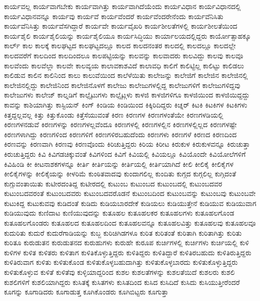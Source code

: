 {ಕಾರ್ಯವಲ್ಲ
ಕಾರ್ಯವಾಗಬೇಕು
ಕಾರ್ಯವಾಗಿತ್ತು
ಕಾರ್ಯವಾಗಿದೆಯೆಂದು
ಕಾರ್ಯವಿಧಾನ
ಕಾರ್ಯವಿಧಾನದಲ್ಲಿ
ಕಾರ್ಯವಿಧಾನವನ್ನೂ
ಕಾರ್ಯವು
ಕಾರ್ಯವೆ
ಕಾರ್ಯವೆಂದರೆ
ಕಾರ್ಯವೆಂದರೇನೆಂದು
ಕಾರ್ಯವೆನಿಸಿತು
ಕಾರ್ಯವೆನಿಸಿತ್ತು
ಕಾರ್ಯವೆಸಗಿದ್ದಾರೆ
ಕಾರ್ಯವೇ
ಕಾರ್ಯವೈಖರಿ
ಕಾರ್ಯಶೀಲತೆಗಳಲ್ಲಿ
ಕಾರ್ಯಶೀಲತೆಯಿಂದ
ಕಾರ್ಯಶೈಲಿ
ಕಾರ್ಯಶೈಲಿಯನ್ನು
ಕಾರ್ಯಶೈಲಿಯೂ
ಕಾರ್ಯಸಿದ್ಧಿಯು
ಕಾರ್ಯಾಲಯದಲ್ಲಿದ್ದರು
ಕಾರ್ಯೋತ್ಸಾಹಕ್ಕೂ
ಕಾರ್ಲ್
ಕಾಲ
ಕಾಲಕ್ಕೆ
ಕಾಲಘಟ್ಟದ
ಕಾಲಘಟ್ಟದಲ್ಲೂ
ಕಾಲದ
ಕಾಲದನಂತರ
ಕಾಲದಲ್ಲಿ
ಕಾಲದಲ್ಲೂ
ಕಾಲದಲ್ಲೇ
ಕಾಲದವರೆಗೆ
ಕಾಲದಿಂದ
ಕಾಲದಿಂದಲೂ
ಕಾಲಪಟ್ಟಿಯನ್ನು
ಕಾಲವನ್ನು
ಕಾಲವಾದರು
ಕಾಲವಿದ್ದು
ಕಾಲವು
ಕಾಲವೂ
ಕಾಲವೆಂದು
ಕಾಲವೆಲ್ಲಾ
ಕಾಲವೇ
ಕಾಲವ್ಯಯ
ಕಾಲಾವಕಾಶವಿದೆ
ಕಾಲಾವಧಿ
ಕಾಲಿಗೆ
ಕಾಲಿಟ್ಟಿಲ್ಲ
ಕಾಲಿಟ್ಟು
ಕಾಲಿಡಲು
ಕಾಲಿಡುವ
ಕಾಲಿನ
ಕಾಲಿನಿಂದ
ಕಾಲು
ಕಾಲುವೆಯಿಂದ
ಕಾಲೆಳೆಯಿತು
ಕಾಲೇಜನ್ನು
ಕಾಲೇಜಿಗೆ
ಕಾಲೇಜಿನ
ಕಾಲೇಜಿನಲ್ಲಿ
ಕಾಲೇಜಿನಲ್ಲಿದ್ದು
ಕಾಲೇಜಿನಿಂದ
ಕಾಲೇಜಿನೊಳಗೆ
ಕಾಲೇಜು
ಕಾಲೇಜುಗಳಲ್ಲಿದ್ದ
ಕಾಲೇಜುಗಳಿಗೆ
ಕಾಲೇಜುಗಳಿದ್ದವು
ಕಾಲೇಜುಗಳು
ಕಾಲೇಜ್
ಕಾಲ್ನಡಿಗೆ
ಕಾಲ್ಸೈಟುಗಳು
ಕಾಲ್ಸೈಟ್ಗಳು
ಕಾಳಜಿ
ಕಾಳಜಿಗಳಿಗೂ
ಕಾಳಜಿಯಿಂದ
ಕಾಳಜಿಯಿದ್ದದ್ದು
ಕಾವನ್ನು
ಕಾಶಿಯಾಗಿತ್ತು
ಕಾಸ್ಟಿಯನ್
ಕಿಂಗ್
ಕಿಂಡಿಯ
ಕಿಂಡಿಯಿಂದ
ಕಿಕ್ಕಿರಿದಿದ್ದರು
ಕಿಚ್ನರ್
ಕಿಟಕಿ
ಕಿಟಕಿಗಳ
ಕಿಟಕಿಗಳು
ಕಿತ್ತದ್ದಲ್ಲವಲ್ಲ
ಕಿತ್ತು
ಕಿತ್ತುಕೊಂಡು
ಕಿತ್ತೆಸೆಯುವಂತೆ
ಕಿರಣ
ಕಿರಣಗಳ
ಕಿರಣಗಳಂತೆಯೇ
ಕಿರಣಗಳಡಿಯಲ್ಲಿ
ಕಿರಣಗಳನಡುವೆ
ಕಿರಣಗಳನ್ನು
ಕಿರಣಗಳಲ್ಲವೆಂದೂ
ಕಿರಣಗಳಲ್ಲಿ
ಕಿರಣಗಳಲ್ಲಿನ
ಕಿರಣಗಳಲ್ಲಿಲ್ಲದ
ಕಿರಣಗಳಷ್ಟೇ
ಕಿರಣಗಳಾಗಿದ್ದು
ಕಿರಣಗಳಿಂದ
ಕಿರಣಗಳಿಗೆ
ಕಿರಣಗಳಿರಬಹುದೆಂದು
ಕಿರಣಗಳು
ಕಿರಣಗಳೆ
ಕಿರಣದ
ಕಿರಣದಿಂದ
ಕಿರಣವನ್ನು
ಕಿರಣವಾಗಿ
ಕಿರಣವು
ಕಿರಣವೊಂದು
ಕಿರಿಚುತ್ತಿದ್ದರು
ಕಿರಿಯ
ಕಿರೀಟ
ಕಿರುಕುಳ
ಕಿರುಕುಳವನ್ನೂ
ಕಿರುಚುತ್ತಾ
ಕಿರುಚುತ್ತಿದ್ದರು
ಕಿವಿ
ಕಿವಿಗಡಚಿಕ್ಕುವಂತೆ
ಕಿವಿಗಳಿಂದ
ಕಿವಿಗೆ
ಕಿವಿಯಲ್ಲಿ
ಕಿವಿಯಲ್ಲೂ
ಕಿವಿಯೊಂದೇ
ಕಿವಿಯೋಲೆಗಳಿಗೆ
ಕಿವಿಹಿಂಡಿ
ಕೀ
ಕೀಟನಾಶಕಗಳನ್ನೂ
ಕೀರ್ತಿ
ಕೀರ್ತಿಯನ್ನು
ಕೀರ್ತಿಯಲ್ಲಿ
ಕೀರ್ತಿಯಾಗಿದೆ
ಕೀಲಿ
ಕೀಲಿಕೈ
ಕೀಲಿಕೈಗಳ
ಕೀಲಿಕೈಗಳನ್ನು
ಕೀಲಿಕೈಯನ್ನು
ಕೀಳರಿಮೆ
ಕುಂಠಿತವಾದವು
ಕುಂದಾಗಲಿಲ್ಲ
ಕುಂದಿತು
ಕುಗ್ಗದ
ಕುಗ್ಗಲಿಲ್ಲ
ಕುಗ್ಗಿದಂತೆ
ಕುಗ್ಗುವಂತಾಯಿತು
ಕುಟೀರದಂತಿದ್ದ
ಕುಟೀರದಲ್ಲಿ
ಕುಟುಂಬ
ಕುಟುಂಬದ
ಕುಟುಂಬದಲ್ಲಿ
ಕುಟುಂಬದವರ
ಕುಟುಂಬದವರಂತೆ
ಕುಟುಂಬದವರು
ಕುಟುಂಬದವರೊಡನೆ
ಕುಟುಂಬದಿಂದ
ಕುಟುಂಬವನ್ನು
ಕುಟುಂಬವು
ಕುಟುಂಬವೇ
ಕುಟುಕಿದ್ದ
ಕುಟುಕುವವು
ಕುಡಿದಂತೆ
ಕುಡಿದು
ಕುಡಿಯಬಾರದೇಕೆ
ಕುಡಿಯಲು
ಕುಡಿಯುತ್ತೇನೆ
ಕುಡಿಯುವ
ಕುಡಿಯುವಾಗ
ಕುಡಿಯುವುದು
ಕುಣಿದಾಟ
ಕುಣಿಯುವುದನ್ನು
ಕುತೂಹಲ
ಕುತೂಹಲಕರ
ಕುತೂಹಲಗಳು
ಕುತೂಹಲಗೊಂಡ
ಕುತೂಹಲಗೊಂಡರು
ಕುತೂಹಲದ
ಕುತೂಹಲದಿಂದ
ಕುತೂಹಲವನ್ನೂ
ಕುತೂಹಲವಿತ್ತು
ಕುತೂಹಲವು
ಕುತೂಹಲವೂ
ಕುದುರಿತು
ಕುದುರೆ
ಕುದುರೆಗಾಡಿಯನ್ನು
ಕುಬ್ಜ
ಕುರಿಚಿಗಿಡಗಳೂ
ಕುರಿತ
ಕುರಿತಂತೆ
ಕುರಿತಾಗಿ
ಕುರಿತಾಗಿತ್ತು
ಕುರಿತು
ಕುರಿತೂ
ಕುರುಡುತನ
ಕುರುಡುತನದ
ಕುರುಹುಗಳು
ಕುರುಹೇ
ಕುರೂಪ
ಕುರ್ಚಿಗಳಲ್ಲಿ
ಕುರ್ಚಿಗಳು
ಕುರ್ಚಿಯಲ್ಲಿ
ಕುಳಿ
ಕುಳಿಗಳ
ಕುಳಿತ
ಕುಳಿತರು
ಕುಳಿತಾಗ
ಕುಳಿತಿಕೊಳ್ಳುತ್ತಿದ್ದರು
ಕುಳಿತಿದ್ದರು
ಕುಳಿತಿದ್ದಾರೆ
ಕುಳಿತಿರಬಹುದು
ಕುಳಿತಿರುತ್ತಿದ್ದರು
ಕುಳಿತಿರುವಾಗ
ಕುಳಿತು
ಕುಳಿತುಕೊಂಡ
ಕುಳಿತುಕೊಳ್ಳಬಹುದಾಗಿತ್ತು
ಕುಳಿತುಕೊಳ್ಳಬಾರದು
ಕುಳಿತುಕೊಳ್ಳುತ್ತಿದ್ದರು
ಕುಳಿತುಕೊಳ್ಳುವ
ಕುಳಿತೆ
ಕುಳಿತೆವು
ಕುಳ್ಳಿಯಾದ್ದರಿಂದ
ಕುಶಲ
ಕುಶಲತೆಗಳನ್ನು
ಕುಶಲತೆಯಿದೆ
ಕುಶಲರು
ಕುಶಲಿ
ಕುಶಲಿಗಳಿಗೆ
ಕುಶಲಿಯಾಗಿದ್ದರು
ಕುಸಿತಕ್ಕೆ
ಕುಸಿತಗಳು
ಕುಸಿತದಿಂದ
ಕುಸಿದ
ಕುಸಿದಿದೆ
ಕುಸಿದು
ಕುಸಿಯುತ್ತೀರೆಂದರೆ
ಕೂಗನ್ನು
ಕೂಗಾಡಿದರು
ಕೂಗಾಡುತ್ತ
ಕೂಗಿಕೊಂಡರು
ಕೂಗಿಬಿಟ್ಟರು
ಕೂಗುತ್ತಾ
}
